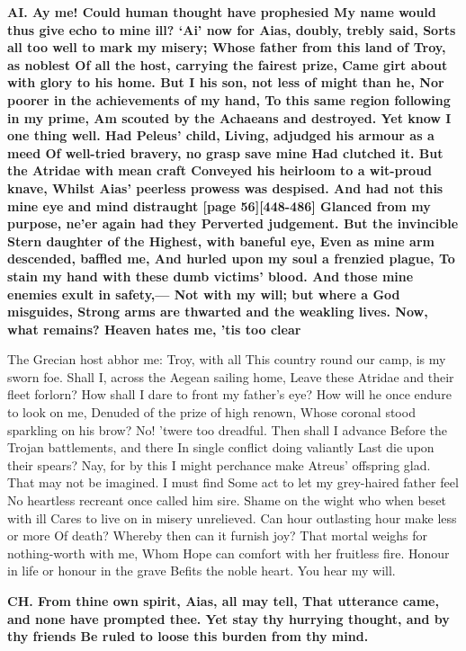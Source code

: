 \documentclass[11pt,letter]{book}
\begin{document}
\par \textbf{AI. Ay me! Could human thought have prophesied My name would thus give echo to mine ill? ‘Ai’ now for Aias, doubly, trebly said, Sorts all too well to mark my misery; Whose father from this land of Troy, as noblest Of all the host, carrying the fairest prize, Came girt about with glory to his home. But I his son, not less of might than he, Nor poorer in the achievements of my hand, To this same region following in my prime, Am scouted by the Achaeans and destroyed. Yet know I one thing well. Had Peleus’ child, Living, adjudged his armour as a meed Of well-tried bravery, no grasp save mine Had clutched it. But the Atridae with mean craft Conveyed his heirloom to a wit-proud knave, Whilst Aias’ peerless prowess was despised. And had not this mine eye and mind distraught [page 56][448-486] Glanced from my purpose, ne’er again had they Perverted judgement. But the invincible Stern daughter of the Highest, with baneful eye, Even as mine arm descended, baffled me, And hurled upon my soul a frenzied plague, To stain my hand with these dumb victims’ blood. And those mine enemies exult in safety,— Not with my will; but where a God misguides, Strong arms are thwarted and the weakling lives. Now, what remains? Heaven hates me, ’tis too clear}
\par   The Grecian host abhor me:  Troy, with all This country round our camp, is my sworn foe. Shall I, across the Aegean sailing home, Leave these Atridae and their fleet forlorn? How shall I dare to front my father’s eye? How will he once endure to look on me, Denuded of the prize of high renown, Whose coronal stood sparkling on his brow? No! ’twere too dreadful. Then shall I advance Before the Trojan battlements, and there In single conflict doing valiantly Last die upon their spears? Nay, for by this I might perchance make Atreus’ offspring glad. That may not be imagined. I must find Some act to let my grey-haired father feel No heartless recreant once called him sire. Shame on the wight who when beset with ill Cares to live on in misery unrelieved. Can hour outlasting hour make less or more Of death? Whereby then can it furnish joy? That mortal weighs for nothing-worth with me, Whom Hope can comfort with her fruitless fire. Honour in life or honour in the grave Befits the noble heart. You hear my will.

\par \textbf{CH. From thine own spirit, Aias, all may tell, That utterance came, and none have prompted thee. Yet stay thy hurrying thought, and by thy friends Be ruled to loose this burden from thy mind.}
\par 
\end{document}
